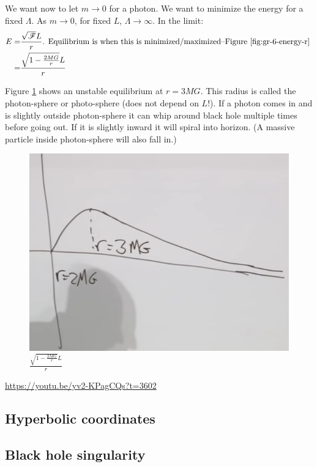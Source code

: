\documentclass[]{article}
\begin{document}
{We want now to let $m \rightarrow 0$ for a photon. We want to minimize the energy for a fixed $\Lambda$. As $m \rightarrow 0$, for fixed $L$, $\Lambda\rightarrow\infty$. In the limit:
\begin{align*}
	E =& \frac{\sqrt{\mathscr{F}} L }{r} \text{. Equilibrium is when this is minimized/maximized--Figure \ref{fig:gr-6-energy-r} }\\
	=& \frac{\sqrt{1-\frac{2MG}{r}} L }{r}
\end{align*}

Figure \ref{fig:gr-6-energy-r} shows an unstable equilibrium at $r=3MG$. This radius is called the photon-sphere or photo-sphere (does not depend on $L$!). If a photon comes in and is slightly outside photon-sphere it can whip around black hole multiple times before going out. If it is slightly inward it will spiral into horizon. (A massive particle inside photon-sphere will also fall in.)
	
	
\begin{figure}[H]
	\caption{$\frac{\sqrt{1-\frac{2MG}{r}} L }{r}$}\label{fig:gr-6-energy-r}
	\includegraphics{gr-6-energy-r}
\end{figure}



\url{https://youtu.be/yv2-KPagCQs?t=3602}



\subsection{Hyperbolic coordinates}
\subsection{Black hole singularity}

}
\end{document}
